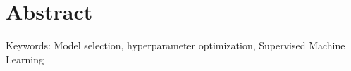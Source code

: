 \cleardoublepage
\chapter*{Abstract}

\lipsum[7]
\vskip0.5cm
Keywords: 
Model selection, hyperparameter optimization, Supervised Machine Learning
